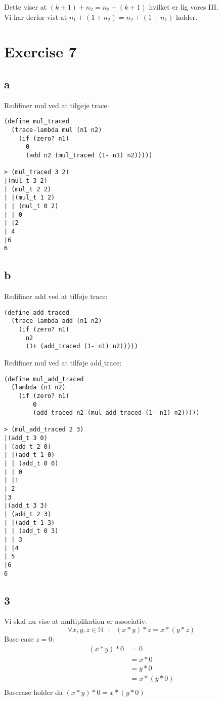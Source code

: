 \documentclass{article}
\begin{document}
Dette viser at $ (k+1) + n_2 =  n_2+(k+1)$ hvilket er lig vores IH.\\
Vi har derfor vist at $ n_1+(1+n_2) = n_2 +(1+n_1)$ holder.

\section*{Exercise 7}

\subsection*{a}
Redifiner mul ved at tilgøje trace:
\begin{verbatim}
(define mul_traced
  (trace-lambda mul (n1 n2)
    (if (zero? n1)
      0
      (add n2 (mul_traced (1- n1) n2)))))

> (mul_traced 3 2)
|(mul_t 3 2)
| (mul_t 2 2)
| |(mul_t 1 2)
| | (mul_t 0 2)
| | 0
| |2
| 4
|6
6
\end{verbatim}


\subsection*{b}
Redifiner add ved at tilføje trace:
\begin{verbatim}
(define add_traced
  (trace-lambda add (n1 n2)
    (if (zero? n1)
      n2
      (1+ (add_traced (1- n1) n2)))))
\end{verbatim}
Redifiner mul ved at tilføje add$\_$trace:
\begin{verbatim}
(define mul_add_traced
  (lambda (n1 n2)
    (if (zero? n1)
        0
        (add_traced n2 (mul_add_traced (1- n1) n2)))))
        
> (mul_add_traced 2 3)
|(add_t 3 0)
| (add_t 2 0)
| |(add_t 1 0)
| | (add_t 0 0)
| | 0
| |1
| 2
|3
|(add_t 3 3)
| (add_t 2 3)
| |(add_t 1 3)
| | (add_t 0 3)
| | 3
| |4
| 5
|6
6
\end{verbatim}

\subsection*{3}
Vi skal nu vise at multiplikation er associativ:
$$ \forall x , y , z \in \mathbb{N} \text{ } : \text{ } (x * y) * z = x * (y * z) $$
Base case $z=0$:
    \begin{equation*}
        \begin{split}
            (x*y) * 0 &= 0\\
                &= x*0\\
                &= y*0\\
                &= x*(y*0)\\
        \end{split}
    \end{equation*}
Basecase holder da $ (x*y) * 0 = x*(y*0) $
\end{document}
